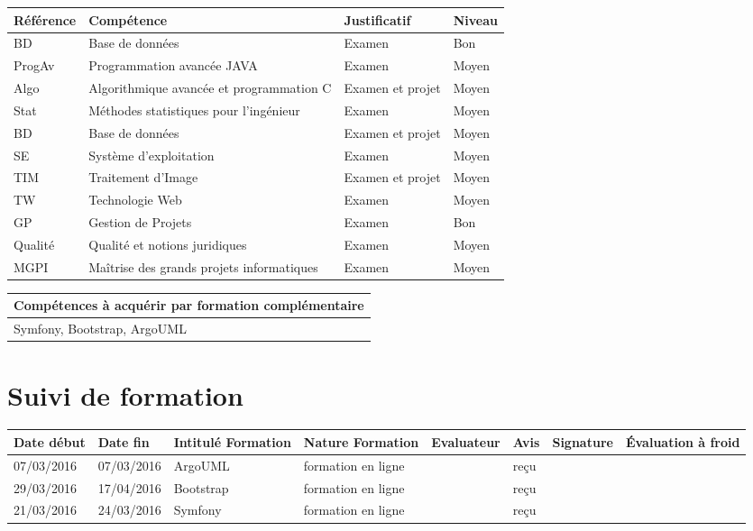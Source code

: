 \documentclass[11pt]{article}
\begin{document}
\centering
	\begin{longtable}{|p{}|p{}|p{}|p{}|}
	\hline
	\rowcolor{gray!40} Référence & Compétence & Justificatif & Niveau \\
	\hline
	 BD & Base de données & Examen & Bon \\
	 \hline
	 ProgAv & Programmation avancée JAVA & Examen & Moyen \\
	\hline
	Algo & Algorithmique avancée et programmation C & Examen et projet & Moyen \\
	\hline
	Stat & Méthodes statistiques pour l'ingénieur & Examen & Moyen \\
	\hline
	BD & Base de données & Examen et projet & Moyen \\
	\hline
	SE & Système d'exploitation & Examen & Moyen \\
	\hline
	TIM & Traitement d'Image & Examen et projet & Moyen \\
	\hline
	TW & Technologie Web & Examen & Moyen \\
	\hline
	GP & Gestion de Projets & Examen & Bon \\
    \hline
	Qualité & Qualité et notions juridiques & Examen & Moyen \\
	\hline
	MGPI & Maîtrise des grands projets informatiques & Examen & Moyen \\
	\hline
	\end{longtable}

\centering
	\begin{longtable}{|p{}|}
	\hline
	\rowcolor{gray!40} Compétences à acquérir par formation complémentaire \\
	\hline
	Symfony, Bootstrap, ArgoUML  \\
	\hline
	\end{longtable}

\section*{\large Suivi de formation}

\centering
	\begin{longtable}{|p{}|p{}|p{}|p{}|p{}|p{}|p{}|p{}|}
	\hline
	\rowcolor{gray!40} \tiny Date début & \tiny Date fin & \tiny Intitulé Formation & \tiny Nature Formation & \tiny Evaluateur & \tiny Avis & \tiny Signature & \tiny Évaluation à froid \\
	\hline
	07/03/2016 &07/03/2016 &ArgoUML &formation en ligne &\Julie & reçu & &  \\
	\hline
	29/03/2016 & 17/04/2016 & Bootstrap &formation en ligne & \Matthieu & reçu & &  \\
	\hline
	21/03/2016 & 24/03/2016 & Symfony &formation en ligne & \Florian & reçu & &  \\
	\hline
	\end{longtable}
\end{document}
